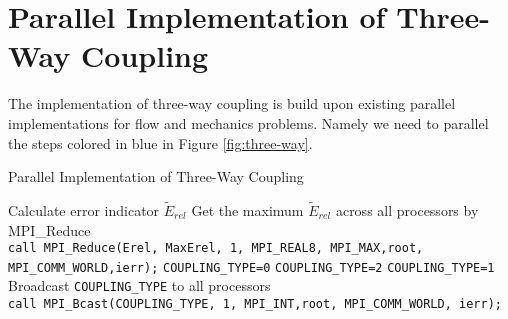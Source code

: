 \documentclass[letterpaper,11pt]{article}
\begin{document}
\section{Parallel Implementation of Three-Way Coupling}
The implementation of three-way coupling is build upon existing parallel implementations for flow and mechanics problems. Namely we need to parallel the steps colored in blue in Figure \ref{fig:three-way}.

\begin{algorithm}
\caption{Parallel Implementation of Three-Way Coupling}\label{algo:parallel}
\begin{algorithmic}[1]

\State Calculate error indicator $\tilde{E}_{rel}$
\State Get the maximum $\tilde{E}_{rel}$ across all processors by MPI\_Reduce \\
\texttt{call MPI\_Reduce(Erel, MaxErel, 1, MPI\_REAL8, MPI\_MAX,root, MPI\_COMM\_WORLD,ierr);}
\State \texttt{COUPLING\_TYPE=0}
 \State \texttt{COUPLING\_TYPE=2}
 \State \texttt{COUPLING\_TYPE=1}
\EndIf
\EndIf
\State Broadcast  \texttt{COUPLING\_TYPE} to all processors\\
\texttt{call MPI\_Bcast(COUPLING\_TYPE, 1, MPI\_INT,root, MPI\_COMM\_WORLD, ierr);}
\end{algorithmic}
\end{algorithm}
 
 
 
\end{document}
